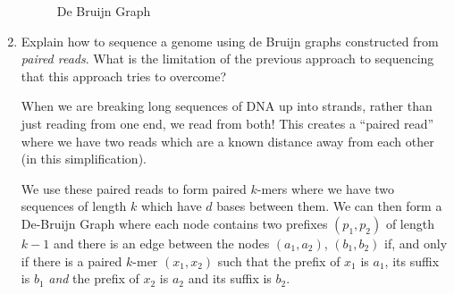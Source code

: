 \documentclass[10pt,\jkfside,a4paper]{article}
\begin{document}
\begin{enumerate}
    \begin{figure}[H]

       \centering


        \caption{De Bruijn Graph}

    \end{figure}

    \item Explain how to sequence a genome using de Bruijn graphs constructed from \textit{paired reads}. What is the limitation of the previous approach to sequencing that this approach tries to overcome?

    When we are breaking long sequences of DNA up into strands, rather than just reading from one end, we read from both! This creates a ``paired read'' where we have two reads which are a known distance away
    from each other (in this simplification).

    We use these paired reads to form paired $k$-mers where we have two sequences of length $k$ which have $d$ bases between them. We can then form a De-Bruijn Graph where each node contains two prefixes
    $(p_1, p_2)$ of length $k - 1$ and there is an edge between the nodes $(a_1, a_2)$, $(b_1, b_2)$ if, and only if there is a paired $k$-mer $(x_1, x_2)$ such that the prefix of $x_1$ is $a_1$, its suffix is
    $b_1$ \textit{and} the prefix of $x_2$ is $a_2$ and its suffix is $b_2$.


\end{enumerate}
\end{document}
